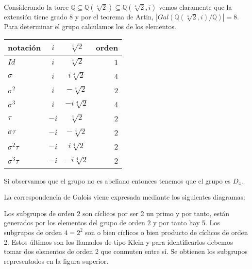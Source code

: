 \begin{enumerate}
Considerando la torre $\mathbb{Q} \subseteq \mathbb{Q}(\sqrt[4]{2}) \subseteq \mathbb{Q}(\sqrt[4]{2},i)$ vemos claramente que la extensión tiene grado 8 y por el teorema de Artin, $|Gal(\mathbb{Q}(\sqrt[4]{2},i)/\mathbb{Q})| = 8$. Para determinar el grupo calculamos los de los elementos.

\begin{center}
  \begin{tabular}{ l | c | c | r }
    \hline
    notación & $i$ & $\sqrt[4]{2}$ & orden \\ \hline
    $Id$ & $i$ & $\sqrt[4]{2}$ & 1 \\ \hline
    $\sigma$ & $i$ & $i\sqrt[4]{2}$ & 4 \\ \hline
    $\sigma^2$ & $i$ & $-\sqrt[4]{2}$ & 2 \\ \hline
    $\sigma^3$ & $i$ & $-i\sqrt[4]{2}$ & 4 \\ \hline
    $\tau$ & $-i$ & $\sqrt[4]{2}$ & 2 \\ \hline
    $\sigma\tau$ & $-i$ & $-\sqrt[4]{2}$ & 2 \\ \hline
    $\sigma^2\tau$ & $-i$ & $i\sqrt[4]{2}$ & 2 \\ \hline
    $\sigma^3\tau$ & $-i$ & $-i\sqrt[4]{2}$ & 2 \\ 
    \hline
  \end{tabular}
\end{center}

Si observamos que el grupo no es abeliano entonces tenemos que el grupo es $D_4$. 

La correspondencia de Galois viene expresada mediante los siguientes diagramas:



Los subgrupos de orden 2 son cíclicos por ser 2 un primo y por tanto, están generados por los elementos del grupo de orden 2 y por tanto hay 5. Los subgrupos de orden $4 = 2^2$ son o bien cíclicos o bien producto de cíclicos de orden 2. Estos últimos son los llamados de tipo Klein y para identificarlos debemos tomar dos elementos de orden 2 que conmuten entre sí. Se obtienen los subgrupos representados en la figura superior. 


\end{enumerate}
